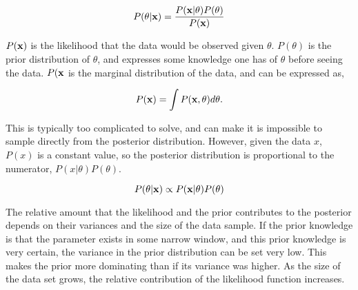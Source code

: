 \begin{equation}
    P(\theta | {\bf x}) = \frac{P({ \bf x}|\theta)P(\theta)}{P({\bf x})}
\end{equation}

$P({\bf x})$ is the likelihood that the data would be observed given $\theta$. $P(\theta)$ is the prior distribution of $\theta$, and expresses some knowledge one has of $\theta$ before seeing the data. $P({\bf x}$ is the marginal distribution of the data, and can be expressed as,

\begin{equation}
    P({\bf x}) = \int P({\bf x},\theta)d\theta.
\end{equation}

This is typically too complicated to solve, and can make it is impossible to sample directly from the posterior distribution. However, given the data $x$, $P(x)$ is a constant value, so the posterior distribution is proportional to the numerator, $P(x|\theta)P(\theta)$. 

\begin{equation}
    P(\theta | {\bf x}) \propto P({\bf x}|\theta)P(\theta)
\end{equation}

The relative amount that the likelihood and the prior contributes to the posterior depends on their variances and the size of the data sample. If the prior knowledge is that the parameter exists in some narrow window, and this prior knowledge is very certain, the variance in the prior distribution can be set very low. This makes the prior more dominating than if its variance was higher. As the size of the data set grows, the relative contribution of the likelihood function increases. 










